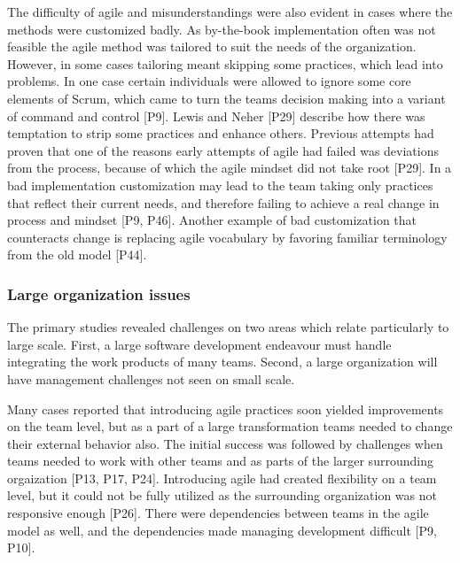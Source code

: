 \documentclass[preprint,authoryear,12pt]{elsarticle}
\begin{document}
The difficulty of agile and misunderstandings were also evident in cases where
the methods were customized badly. As by-the-book implementation often was not
feasible the agile method was tailored to suit the needs of the organization.
However, in some cases tailoring meant skipping some practices, which lead into
problems. In one case certain individuals were allowed to ignore some core
elements of Scrum, which came to turn the teams decision making into a variant
of command and control [P9].
Lewis and Neher [P29] describe how there was temptation to strip some practices
and enhance others. Previous attempts had proven that one of the reasons early
attempts of agile had failed was deviations from the process, because of which
the agile mindset did not take root [P29]. In a bad implementation customization
may lead to the team taking only practices that reflect their current needs, and
therefore failing to achieve a real change in process and mindset [P9, P46].
Another example of bad customization that counteracts change is replacing agile
vocabulary by favoring familiar terminology from the old model [P44].



\subsubsection{Large organization issues}


The primary studies revealed challenges on two areas which relate particularly
to large scale. First, a large software development endeavour must handle
integrating the work products of many teams. Second, a large organization will
have management challenges not seen on small scale.






Many cases reported that introducing agile practices soon yielded improvements
on the team level, but as a part of a large transformation teams needed to
change their external behavior also.
The initial success was followed by challenges when teams needed to work with
other teams and as parts of the larger surrounding orgaization [P13, P17, P24].
Introducing agile had created flexibility on a team level, but it could not be
fully utilized as the surrounding organization was not responsive enough [P26].
There were dependencies between teams in the agile model as well, and the
dependencies made managing development difficult [P9, P10].
\end{document}

